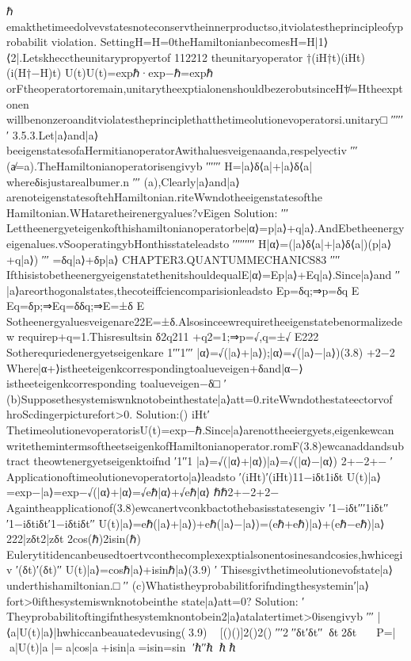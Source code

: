 {{ℏ
emakthetimeedolvevstatesnoteconservtheinnerproductso,itviolatestheprincipleofyprobabilit
violation.
SettingH=H=0theHamiltonianbecomesH=H|1⟩⟨2|.Letskhecctheunitarypropyertof
112212
theunitaryoperator
†(iH†t)(iHt)(i(H†−H)t)
U(t)U(t)=expℏ·exp−ℏ=expℏ
orFtheoperatortoremain,unitarytheexptialonenshouldbezerobutsinceH†̸=Htheexptonen
willbenonzeroanditviolatestheprinciplethatthetimeolutionevoperatorsi.unitary□
′′′′′′
3.5.3.Let|a⟩and|a⟩beeigenstatesofaHermitianoperatorAwithaluesveigenaanda,respelyectiv
′′′
(a̸=a).TheHamiltonianoperatorisengivyb
′′′′′′
H=|a⟩δ⟨a|+|a⟩δ⟨a|
whereδisjustarealbumer.n
′′′
(a),Clearly|a⟩and|a⟩arenoteigenstatesoftehHamiltonian.riteWwndotheeigenstatesofthe
Hamiltonian.WHataretheirenergyalues?vEigen
Solution:
′′′
Lettheenergyeteigenkofthishamiltonianoperatorbe|α⟩=p|a⟩+q|a⟩.AndEbetheenergy
eigenalues.vSooperatingybHonthisstateleadsto
′′′′′′′′′
H|α⟩=(|a⟩δ⟨a|+|a⟩δ⟨a|)(p|a⟩+q|a⟩)
′′′
=δq|a⟩+δp|a⟩
CHAPTER3.QUANTUMMECHANICS83
′′′′
IfthisistobetheenergyeigenstatethenitshouldequalE|α⟩=Ep|a⟩+Eq|a⟩.Since|a⟩and
′′
|a⟩areorthogonalstates,thecoteiffciencomparisionleadsto
Ep=δq;⇒p=δq
E
Eq=δp;⇒Eq=δδq;⇒E=±δ
E
Sotheenergyaluesveigenare22E=±δ.Alsosinceewrequiretheeigenstatebenormalizedew
requirep+q=1.Thisresultsin
δ2q211
+q2=1;⇒p=√,q=±√
E222
Sotherequriedenergyetseigenkare
1′′′1′′′
|α⟩=√(|a⟩+|a⟩);|α⟩=√(|a⟩−|a⟩)(3.8)
+2−2
Where|α+⟩istheeteigenkcorrespondingtoalueveigen+δand|α−⟩istheeteigenkcorresponding
toalueveigen−δ□
′
(b)Supposethesystemiswnknotobeinthestate|a⟩att=0.riteWwndothestateectorvof
hroScdingerpicturefort>0.
Solution:()
iHt′
ThetimeolutionevoperatorisU(t)=exp−ℏ.Since|a⟩arenottheeiergyets,eigenkewcan
writethemintermsoftheetseigenkofHamiltonianoperator.romF(3.8)ewcanaddandsubtract
theowtenergyetseigenktoifnd
′1′′1
|a⟩=√(|α⟩+|α⟩)|a⟩=√(|α⟩−|α⟩)
2+−2+−
′
Applicationoftimeolutionevoperatorto|a⟩leadsto
′(iHt)′(iHt)11−iδt1iδt
U(t)|a⟩=exp−|a⟩=exp−√(|α⟩+|α⟩=√eℏ|α⟩+√eℏ|α⟩
ℏℏ2+−2+2−
Againtheapplicationof(3.8)ewcanertvconkbactothebasisstatesengiv
′1−iδt′′′1iδt′′′1−iδtiδt′1−iδtiδt′′
U(t)|a⟩=eℏ(|a⟩+|a⟩)+eℏ(|a⟩−|a⟩)=(eℏ+eℏ)|a⟩+(eℏ−eℏ)|a⟩
222|{zδt}2|{zδt}
2cos(ℏ)2isin(ℏ)
Eulerytitidencanbeusedtoertvconthecomplexexptialsonentosinesandcosies,hwhicegiv
′(δt)′(δt)′′
U(t)|a⟩=cosℏ|a⟩+isinℏ|a⟩(3.9)
′
Thisesgivthetimeolutionevofstate|a⟩underthishamiltonian.□
′′
(c)Whatistheyprobabilitforifndingthesystemin′|a⟩fort>0ifthesystemiswnknotobeinthe
state|a⟩att=0?
Solution:
′
Theyprobabilitoftingifnthesystemknontobein2|a⟩atalatertimet>0isengivyb
′′′
|⟨a|U(t)|a⟩|hwhiccanbeauatedevusing(3.9)
[()()]2()2()
′′′2′′δt′δt′′δt2δt

P=|⟨a|U(t)|a⟩|=⟨a|cos|a⟩+isin|a⟩=isin=sin
′ℏ′′ℏℏℏ
}}
